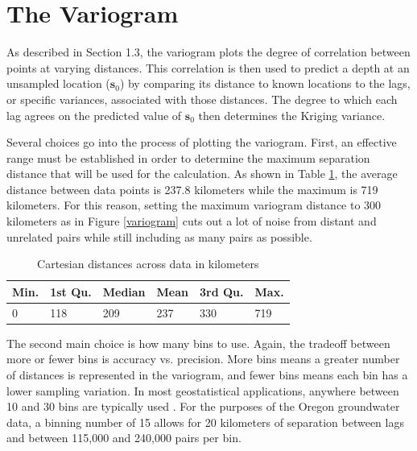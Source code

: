 \documentclass[12pt,twoside]{reedthesis}
\begin{document}
\section{The Variogram}


As described in Section 1.3, the variogram plots the degree of correlation between points at varying distances. This correlation is then used to predict a depth at an unsampled location ($\mathbf{s}_0$) by comparing its distance to known locations to the lags, or specific variances, associated with those distances. The degree to which each lag agrees on the predicted value of $\mathbf{s}_0$ then determines the Kriging variance. 

Several choices go into the process of plotting the variogram. First, an effective range must be established in order to determine the maximum separation distance that will be used for the calculation. As shown in Table \ref{dists}, the average distance between data points is 237.8 kilometers while the maximum is 719 kilometers. For this reason, setting the maximum variogram distance to 300 kilometers as in Figure \ref{variogram} cuts out a lot of noise from distant and unrelated pairs while still including as many pairs as possible. 

\begin{table}[h]

\centering

\begin{tabular}{l|l|l|l|l|l}

\hline
Min.  & 1st Qu.  & Median  &   Mean  & 3rd Qu.  &   Max. \\
\hline
  0 & 118 & 209 & 237 & 330 & 719 \\
\hline

\end{tabular}

\caption{Cartesian distances across data in kilometers}
\label{dists}

\end{table}
The second main choice is how many bins to use. Again, the tradeoff between more or fewer bins is accuracy vs. precision. More bins means a greater number of distances is represented in the variogram, and fewer bins means each bin has a lower sampling variation. In most geostatistical applications, anywhere between 10 and 30 bins are typically used \cite{gelfand:2010}. For the purposes of the Oregon groundwater data, a binning number of 15 allows for 20 kilometers of separation between lags and between 115,000 and 240,000 pairs per bin. 
\end{document}
